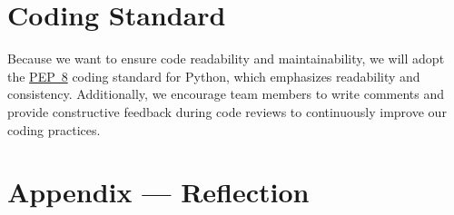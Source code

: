 \documentclass{article}
\begin{document}

\section{Coding Standard}

Because we want to ensure code readability and maintainability,
we will adopt the \href{https://peps.python.org/pep-0008/}{PEP~8} coding standard for Python, which emphasizes readability and consistency.
Additionally, we encourage team members to write comments and provide constructive feedback during code reviews
to continuously improve our coding practices.
\newpage{}

\section*{Appendix --- Reflection}
\end{document}
